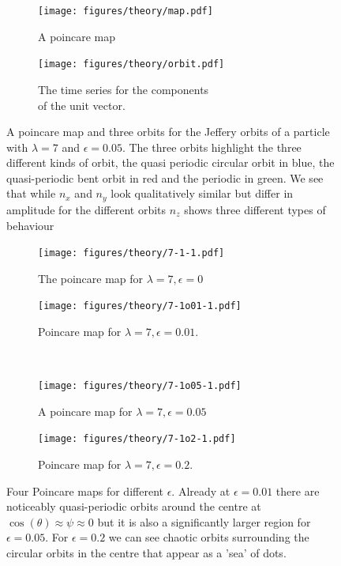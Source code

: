 \begin{figure}[H]
\centering
\begin{subfigure}[b]{0.45\textwidth}
\texttt{[image: figures/theory/map.pdf]}
\caption{A poincare map}\label{fig:orbitmap}
\end{subfigure}\hspace{1em}%
\begin{subfigure}[b]{0.45\textwidth}
\texttt{[image: figures/theory/orbit.pdf]}
\caption{The time series for the components \\ of the unit vector.}\label{fig:orbitparams}
\end{subfigure}
\caption{A poincare map and three orbits for the Jeffery orbits of a particle with $\lambda=7$ and $\epsilon=0.05$. The three orbits highlight the three different kinds of orbit, the quasi periodic circular orbit in blue, the quasi-periodic bent orbit in red and the periodic in green. We see that while $n_x$ and $n_y$ look qualitatively similar but differ in amplitude for the different orbits $n_z$ shows three different types of behaviour}
\label{fig:orbittypes}
\end{figure}



\begin{figure}[H]
\centering
\begin{subfigure}[3a]{0.40\textwidth}
\texttt{[image: figures/theory/7-1-1.pdf]}
\caption{The poincare map for $\lambda = 7, \epsilon = 0$}\label{fig:orbitmap1}
\end{subfigure}\hspace{1em}%
\begin{subfigure}[3b]{0.40\textwidth}
\texttt{[image: figures/theory/7-1o01-1.pdf]}
\caption{Poincare map for $\lambda = 7, \epsilon = 0.01$.}\label{fig:orbitmap2}
\end{subfigure} \\
\begin{subfigure}[3a]{0.40\textwidth}
\texttt{[image: figures/theory/7-1o05-1.pdf]}
\caption{A poincare map for $\lambda = 7, \epsilon = 0.05$}\label{fig:orbitmap3}
\end{subfigure}\hspace{1em}%
\begin{subfigure}[3b]{0.40\textwidth}
\texttt{[image: figures/theory/7-1o2-1.pdf]}
\caption{Poincare map for $\lambda = 7, \epsilon = 0.2$.}\label{fig:orbitmap4}
\end{subfigure} 
\caption{Four Poincare maps for different $\epsilon$. Already at $\epsilon = 0.01$ there are noticeably quasi-periodic 
orbits around the centre at $\cos(\theta) \approx \psi \approx 0$ but it is also a significantly larger region for $\epsilon = 0.05$. For $\epsilon = 0.2$ we can see chaotic orbits surrounding the circular orbits in the centre that appear as a 'sea' of dots.}\label{fig:orbitmaps}
\end{figure}

